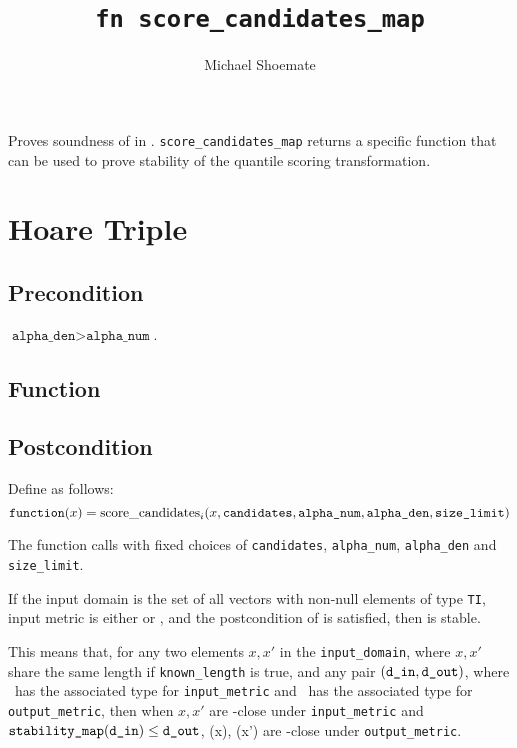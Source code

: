 \documentclass{article}
\title{\texttt{fn score\_candidates\_map}}
\author{Michael Shoemate}
\begin{document}
\maketitle  


\contrib

Proves soundness of  
in .
\texttt{score\_candidates\_map} returns a specific function that can be used to prove stability of the quantile scoring transformation.

\section{Hoare Triple}
\subsection*{Precondition}
$\texttt{alpha\_den} > \texttt{alpha\_num}$.

\subsection*{Function}
\label{sec:python-pseudocode}



\subsection*{Postcondition}

\begin{theorem}
    Define \function as follows:
    \begin{equation*}
        \texttt{function}(x) = \mathrm{score\_candidates}_i(x, \texttt{candidates}, \texttt{alpha\_num}, \texttt{alpha\_den}, \texttt{size\_limit})
    \end{equation*}

    The function calls  with fixed choices of
    \texttt{candidates}, \texttt{alpha\_num}, \texttt{alpha\_den} and \texttt{size\_limit}.

    If the input domain is the set of all vectors with non-null elements of type \texttt{TI},
    input metric is either  or ,
    and the postcondition of \function is satisfied, then \function is stable.

    This means that, for any two elements $x, x'$ in the \texttt{input\_domain},
        where $x, x'$ share the same length if \texttt{known\_length} is true,
    and any pair $(\texttt{d\_in}, \texttt{d\_out})$, 
        where \din\ has the associated type for \texttt{input\_metric} and \dout\ has the associated type for \texttt{output\_metric},
    then when $x, x'$ are \din-close under \texttt{input\_metric} and $\texttt{stability\_map}(\texttt{d\_in}) \leq \texttt{d\_out}$,
    \function(x), \function(x') are \dout-close under \texttt{output\_metric}.
\end{theorem}
\end{document}
